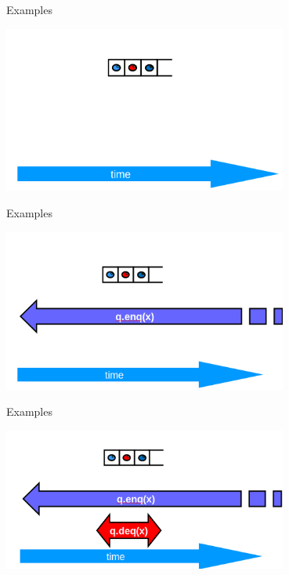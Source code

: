 \begin{frame}{Examples}
\begin{center} \includegraphics[width=0.7\textwidth]{./pics/linear/71.png} \end{center}
\end{frame}

\begin{frame}{Examples}
\begin{center} \includegraphics[width=0.7\textwidth]{./pics/linear/72.png} \end{center}
\end{frame}

\begin{frame}{Examples}
\begin{center} \includegraphics[width=0.7\textwidth]{./pics/linear/73.png} \end{center}
\end{frame}

